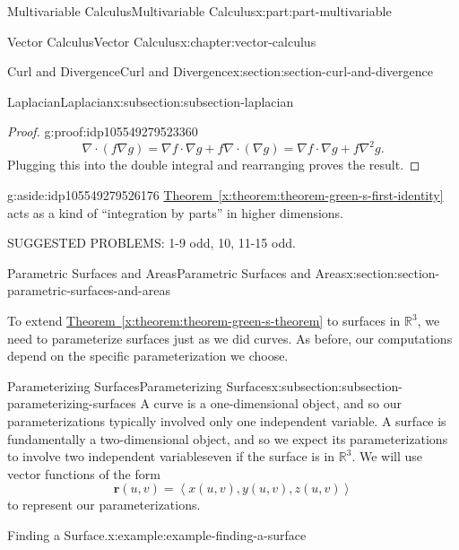 \documentclass[twoside,10pt,]{book}
\newcommand{\xreffont}{\relax}
\numberwithin{equation}{part}
\newcommand{\RR}{\mathbb{R}}
\newcommand{\grad}{\nabla}
\renewcommand{\div}{\nabla\cdot}
\newcommand{\del}{\nabla}
\newcommand{\vb}[1]{\mathbf{#1}}
\newcommand{\dotprod}[1]{\left\langle #1 \right\rangle}
\begin{document}
\begin{partptx}{Multivariable Calculus}{}{Multivariable Calculus}{}{}{x:part:part-multivariable}
\begin{chapterptx}{Vector Calculus}{}{Vector Calculus}{}{}{x:chapter:vector-calculus}
\begin{sectionptx}{Curl and Divergence}{}{Curl and Divergence}{}{}{x:section:section-curl-and-divergence}
\begin{subsectionptx}{Laplacian}{}{Laplacian}{}{}{x:subsection:subsection-laplacian}
\begin{proof}{}{g:proof:idp105549279523360}
\begin{equation*}
\div(f\grad g) = \grad f\cdot \grad g + f \div(\grad g) = \grad f\cdot\grad g + f\del^{2}g\text{.}
\end{equation*}
Plugging this into the double integral and rearranging proves the result.%
\end{proof}
\begin{aside}{}{g:aside:idp105549279526176}%
\hyperref[x:theorem:theorem-green-s-first-identity]{Theorem~{\xreffont\ref{x:theorem:theorem-green-s-first-identity}}} acts as a kind of ``integration by parts'' in higher dimensions.%
\end{aside}
\end{subsectionptx}
\begin{conclusion}{}%
SUGGESTED PROBLEMS: 1-9 odd, 10, 11-15 odd.%
\end{conclusion}%
\end{sectionptx}
%
%
\typeout{************************************************}
\typeout{************************************************}
%
\begin{sectionptx}{Parametric Surfaces and Areas}{}{Parametric Surfaces and Areas}{}{}{x:section:section-parametric-surfaces-and-areas}
\begin{introduction}{}%
To extend \hyperref[x:theorem:theorem-green-s-theorem]{Theorem~{\xreffont\ref{x:theorem:theorem-green-s-theorem}}} to surfaces in \(\RR^{3}\), we need to parameterize surfaces just as we did curves. As before, our computations depend on the specific parameterization we choose.%
\end{introduction}%
%
%
\typeout{************************************************}
\typeout{************************************************}
%
\begin{subsectionptx}{Parameterizing Surfaces}{}{Parameterizing Surfaces}{}{}{x:subsection:subsection-parameterizing-surfaces}
A curve is a one-dimensional object, and so our parameterizations typically involved only one independent variable. A surface is fundamentally a two-dimensional object, and so we expect its parameterizations to involve two independent variables\textemdash{}even if the surface is in \(\RR^{3}\). We will use vector functions of the form%
\begin{equation*}
\vb{r}(u,v) = \dotprod{x(u,v), y(u,v), z(u,v)}
\end{equation*}
to represent our parameterizations.%
\begin{example}{Finding a Surface.}{x:example:example-finding-a-surface}%

\end{example}
\end{subsectionptx}
\end{sectionptx}
\end{chapterptx}
\end{partptx}
\end{document}
